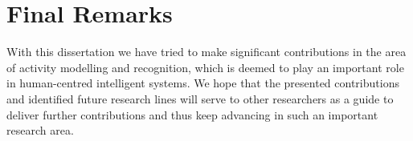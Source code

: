 \section{Final Remarks}
\label{sec:conclusions:final}

With this dissertation we have tried to make significant contributions in the area of activity modelling and recognition, which is deemed to play an important role in human-centred intelligent systems. We hope that the presented contributions and identified future research lines will serve to other researchers as a guide to deliver further contributions and thus keep advancing in such an important research area.